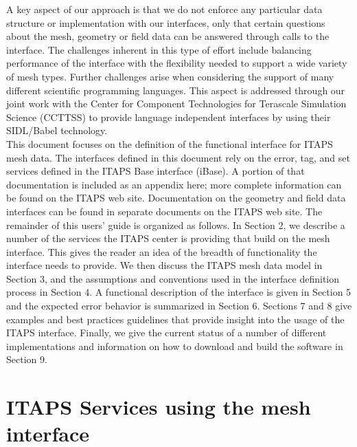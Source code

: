 \documentclass{article}
\begin{document}
A key aspect of our approach is that we do not enforce any particular 
data structure or implementation with our interfaces, only that 
certain questions about the mesh, geometry or field data can 
be answered through calls to the interface. The challenges inherent 
in this type of effort include balancing performance of the interface 
with the flexibility needed to support a wide variety of mesh 
types. Further challenges arise when considering the support 
of many different scientific programming languages. This aspect 
is addressed through our joint work with the Center for Component 
Technologies for Terascale Simulation Science (CCTTSS) to provide 
language independent interfaces by using their SIDL/Babel technology. \\

This document focuses on the definition of the functional interface 
for ITAPS mesh data.  The interfaces defined in this document 
rely on the error, tag, and set services defined in the ITAPS 
Base interface (iBase). A portion of that documentation is included 
as an appendix here; more complete information can be found on 
the ITAPS web site. Documentation on the geometry and field data 
interfaces can be found in separate documents on the ITAPS web 
site. The remainder of this users' guide is organized as follows. 
In Section 2, we describe a number of the services the ITAPS center 
is providing that build on the mesh interface. This gives the 
reader an idea of the breadth of functionality the interface 
needs to provide. We then discuss the ITAPS mesh data model in 
Section 3, and the assumptions and conventions used in the interface 
definition process in Section 4. A functional description of 
the interface is given in Section 5 and the expected error behavior 
is summarized in Section 6. Sections 7 and 8 give examples and 
best practices guidelines that provide insight into the usage 
of the ITAPS interface. Finally, we give the current status of 
a number of different implementations and information on how 
to download and build the software in Section 9.

\section{ITAPS Services using the mesh interface}
\end{document}
